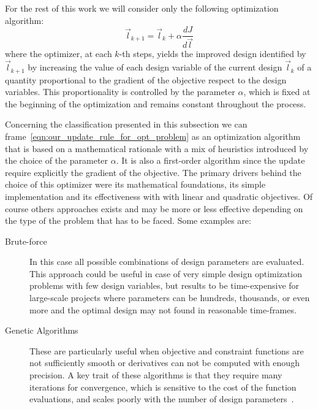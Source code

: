 For the rest of this work we will consider only the following optimization algorithm:
\begin{equation}
	\label{eqn:our_update_rule_for_opt_problem}
	\vec{l}_{k+1} = \vec{l}_k + \alpha \frac{d J}{d \vec{l}}
\end{equation}
where the optimizer, at each $k$-th steps, yields the improved design identified by $\vec{l}_{k+1}$ by increasing the value of each design variable of the current design $\vec{l}_k$ of a quantity proportional to the gradient of the objective respect to the design variables. This proportionality is controlled by the parameter $\alpha$, which is fixed at the beginning of the optimization and remains constant throughout the process.

Concerning the classification presented in this subsection we can frame~\eqref{eqn:our_update_rule_for_opt_problem} as an optimization algorithm that is based on a mathematical rationale with a mix of heuristics introduced by the choice of the parameter $\alpha$. It is also a first-order algorithm since the update require explicitly the gradient of the objective.
The primary drivers behind the choice of this optimizer were its mathematical foundations, its simple implementation and its effectiveness with with linear and quadratic objectives. Of course others approaches exists and may be more or less effective depending on the type of the problem that has to be faced. Some examples are:
\begin{description}
	\item[Brute-force] In this case all possible combinations of design parameters are evaluated. This approach could be useful in case of very simple design optimization problems with few design variables, but results to be time-expensive for large-scale projects where parameters can be hundreds, thousands, or even more and the optimal design may not found in reasonable time-frames.
	\item[Genetic Algorithms] These are particularly useful when objective and constraint functions are not sufficiently smooth or derivatives can not be computed with enough precision. A key trait of these algorithms is that they require many iterations for convergence, which is sensitive to the cost of the function evaluations, and scales poorly with the number of design parameters~\cite{Joaquim:engineering_design_opt}.
\end{description}

